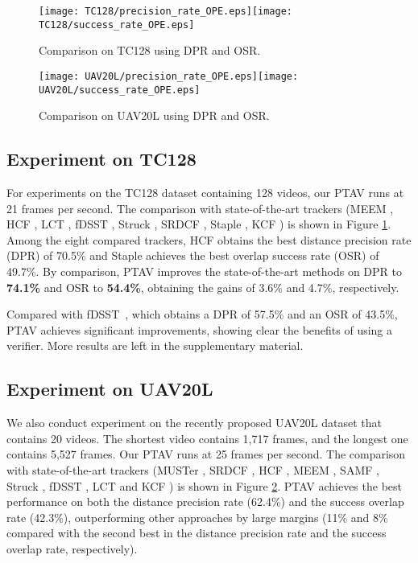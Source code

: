 \documentclass[10pt,twocolumn,letterpaper]{article}
\begin{document}
\begin{figure}[!t]
\centering
\texttt{[image: TC128/precision\_rate\_OPE.eps]}\texttt{[image: TC128/success\_rate\_OPE.eps]}
\caption{Comparison on TC128 using DPR and OSR.}
\label{comparison_TC}
\end{figure}

\begin{figure}[!t]
\centering
\texttt{[image: UAV20L/precision\_rate\_OPE.eps]}\texttt{[image: UAV20L/success\_rate\_OPE.eps]}
\caption{Comparison on UAV20L using DPR and OSR.}
\label{comparison_UAV20L}
\end{figure}

\subsection{Experiment on TC128}
For experiments on the TC128 \cite{liang2015encoding} dataset containing 128 videos, our PTAV runs at 21 frames per second. The comparison with state-of-the-art trackers (MEEM \cite{zhang2014meem}, HCF \cite{ma2015hierarchical}, LCT \cite{ma2015long}, fDSST \cite{danelljan2016discriminative}, Struck \cite{hare2016struck}, SRDCF \cite{danelljan2015learning}, Staple \cite{bertinetto2016staple}, KCF \cite{henriques2015high}) is shown in Figure \ref{comparison_TC}. Among the eight compared trackers, HCF \cite{ma2015hierarchical} obtains the best distance precision rate (DPR) of 70.5\% and Staple \cite{bertinetto2016staple} achieves the best overlap success rate (OSR) of 49.7\%. By comparison, PTAV improves the state-of-the-art methods on DPR to \textbf{74.1\%} and OSR to \textbf{54.4\%}, obtaining the gains of 3.6\% and 4.7\%, respectively.

Compared with fDSST~\cite{danelljan2016discriminative}, which obtains a DPR of 57.5\% and an OSR of 43.5\%, PTAV achieves significant improvements, showing clear the benefits of using a verifier. More results are left in the supplementary material.

\subsection{Experiment on UAV20L}
We also conduct experiment on the recently proposed UAV20L \cite{mueller2016benchmark} dataset that contains 20 videos. The shortest video contains 1,717 frames, and the longest one contains 5,527 frames. Our PTAV runs at 25 frames per second. The comparison with state-of-the-art trackers (MUSTer \cite{hong2015multi}, SRDCF \cite{danelljan2015learning}, HCF \cite{ma2015hierarchical}, MEEM \cite{zhang2014meem}, SAMF \cite{li2014scale}, Struck \cite{hare2016struck}, fDSST \cite{danelljan2016discriminative}, LCT \cite{ma2015long} and KCF \cite{henriques2015high}) is shown in Figure \ref{comparison_UAV20L}.  PTAV achieves the best performance on both the distance precision rate (62.4\%) and the success overlap rate (42.3\%), outperforming other approaches by large margins (11\% and 8\% compared with the second best in the distance precision rate and the success overlap rate, respectively).
\end{document}
